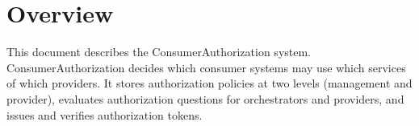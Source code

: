\documentclass[a4paper]{arrowhead}
\begin{document}
\sloppy

\ArrowheadSetup

\begin{center}
  \vspace*{1cm}
  \huge{\arrowtitle}

  \vspace*{0.2cm}
  \LARGE{\arrowtype}
  \vspace*{1cm}

  \vspace*{\fill}


  \vspace*{1cm}
  \vspace*{\fill}

  \begin{abstract}
    This document describes the ConsumerAuthorization core system of the Eclipse Arrowhead 5.2.2 framework, as implemented in Java Spring in \texttt{ah5-core-java-spring/consumer-authorization}, including the local extensions of this workspace.
  \end{abstract}

  \vspace*{1cm}
\end{center}

\newpage

\tableofcontents
\newpage

\section{Overview}
\label{sec:overview}

This document describes the ConsumerAuthorization system. Consumer\allowbreak{}Authorization decides which consumer systems may use which services of which providers. It stores authorization policies at two levels (management and provider), evaluates authorization questions for orchestrators and providers, and issues and verifies authorization tokens.
\end{document}
